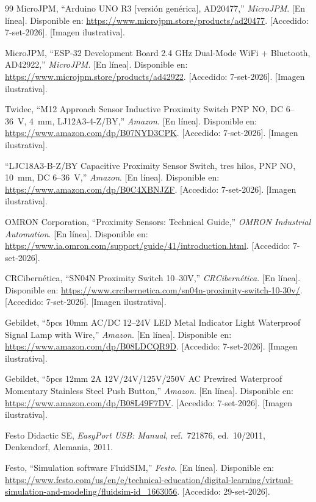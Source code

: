 \documentclass[12pt,a4paper,oneside]{report}
\begin{document}
\begin{thebibliography}{99}
MicroJPM, ``Arduino UNO R3 [versión genérica], AD20477,'' \emph{MicroJPM}. [En línea]. Disponible en:
\url{https://www.microjpm.store/products/ad20477}. [Accedido: 7-set-2026]. [Imagen ilustrativa].

MicroJPM, ``ESP-32 Development Board 2.4 GHz Dual-Mode WiFi + Bluetooth, AD42922,'' \emph{MicroJPM}.
[En línea]. Disponible en:
\url{https://www.microjpm.store/products/ad42922}. [Accedido: 7-set-2026]. [Imagen ilustrativa].

Twidec, ``M12 Approach Sensor Inductive Proximity Switch PNP NO, DC 6--36~V, 4~mm,
LJ12A3-4-Z/BY,'' \emph{Amazon}. [En línea]. Disponible en:
\url{https://www.amazon.com/dp/B07NYD3CPK}. [Accedido: 7-set-2026]. [Imagen ilustrativa].

``LJC18A3-B-Z/BY Capacitive Proximity Sensor Switch, tres hilos, PNP NO, 10~mm, DC 6--36~V,''
\emph{Amazon}. [En línea]. Disponible en:
\url{https://www.amazon.com/dp/B0C4XBNJZF}. [Accedido: 7-set-2026]. [Imagen ilustrativa].

OMRON Corporation, ``Proximity Sensors: Technical Guide,'' \emph{OMRON Industrial Automation}.
[En línea]. Disponible en: \url{https://www.ia.omron.com/support/guide/41/introduction.html}.
[Accedido: 7-set-2026].

CRCibernética, ``SN04N Proximity Switch 10--30V,'' \emph{CRCibernética}. [En línea]. Disponible en:
\url{https://www.crcibernetica.com/sn04n-proximity-switch-10-30v/}. [Accedido: 7-set-2026].
[Imagen ilustrativa].

Gebildet, ``5pcs 10mm AC/DC 12--24V LED Metal Indicator Light Waterproof Signal Lamp with Wire,''
\emph{Amazon}. [En línea]. Disponible en: \url{https://www.amazon.com/dp/B08LDCQR9D}.
[Accedido: 7-set-2026]. [Imagen ilustrativa].

Gebildet, ``5pcs 12mm 2A 12V/24V/125V/250V AC Prewired Waterproof Momentary Stainless Steel Push
Button,'' \emph{Amazon}. [En línea]. Disponible en: \url{https://www.amazon.com/dp/B08L49F7DV}.
[Accedido: 7-set-2026]. [Imagen ilustrativa].

Festo Didactic SE, \emph{EasyPort USB: Manual}, ref.\ 721876, ed.\ 10/2011, Denkendorf, Alemania, 2011.

Festo, ``Simulation software FluidSIM,'' \emph{Festo}. [En línea]. Disponible en:
\url{https://www.festo.com/us/en/e/technical-education/digital-learning/virtual-simulation-and-modeling/fluidsim-id_1663056}.
[Accedido: 29-set-2026].


\end{thebibliography}
\end{document}
